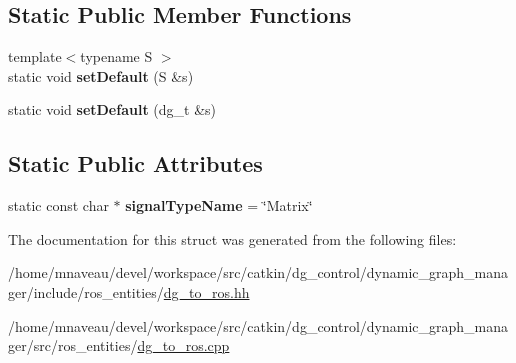 \subsection*{Static Public Member Functions}
\begin{DoxyCompactItemize}
\item 
{\footnotesize template$<$typename S $>$ }\\static void {\bfseries set\+Default} (S \&s)\hypertarget{structdynamic__graph_1_1DgToRos_3_01Matrix_01_4_a4c32ea6763c10fad6c10f65d60177ea0}{}\label{structdynamic__graph_1_1DgToRos_3_01Matrix_01_4_a4c32ea6763c10fad6c10f65d60177ea0}

\item 
static void {\bfseries set\+Default} (dg\+\_\+t \&s)\hypertarget{structdynamic__graph_1_1DgToRos_3_01Matrix_01_4_a2dbd196e96c7b672a7953911d7dc7700}{}\label{structdynamic__graph_1_1DgToRos_3_01Matrix_01_4_a2dbd196e96c7b672a7953911d7dc7700}

\end{DoxyCompactItemize}
\subsection*{Static Public Attributes}
\begin{DoxyCompactItemize}
\item 
static const char $\ast$ {\bfseries signal\+Type\+Name} = \char`\"{}Matrix\char`\"{}\hypertarget{structdynamic__graph_1_1DgToRos_3_01Matrix_01_4_a67981664123dbd7194d1ceb6e370fcd6}{}\label{structdynamic__graph_1_1DgToRos_3_01Matrix_01_4_a67981664123dbd7194d1ceb6e370fcd6}

\end{DoxyCompactItemize}


The documentation for this struct was generated from the following files\+:\begin{DoxyCompactItemize}
\item 
/home/mnaveau/devel/workspace/src/catkin/dg\+\_\+control/dynamic\+\_\+graph\+\_\+manager/include/ros\+\_\+entities/\hyperlink{dg__to__ros_8hh}{dg\+\_\+to\+\_\+ros.\+hh}\item 
/home/mnaveau/devel/workspace/src/catkin/dg\+\_\+control/dynamic\+\_\+graph\+\_\+manager/src/ros\+\_\+entities/\hyperlink{dg__to__ros_8cpp}{dg\+\_\+to\+\_\+ros.\+cpp}\end{DoxyCompactItemize}
